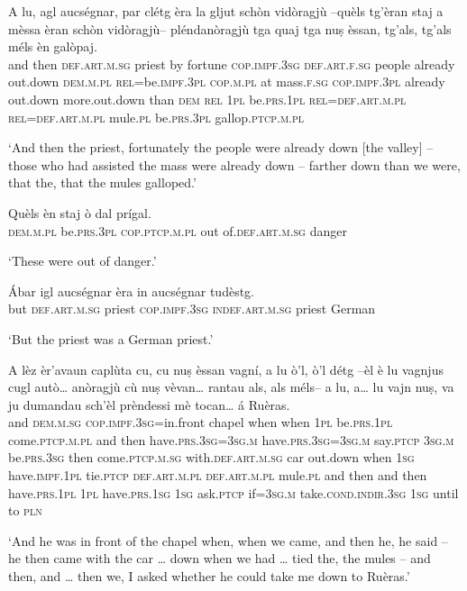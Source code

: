 \begin{linenumbers}
\gll   A lu, agl aucségnar, par clétg èra la gljut schòn vidòragjù –quèls tg’èran staj a mèssa èran schòn vidòragjù– pléndanòragjù tga quaj tga nuṣ èssan, tg’als, tg’als méls èn galòpaj.  \\
and then \textsc{def.art.m.sg} priest by fortune \textsc{cop.impf.3sg} \textsc{def.art.f.sg} people already out.down \textsc{dem.m.pl}   \textsc{rel=}be.\textsc{impf.3pl} \textsc{cop.m.pl} at mass.\textsc{f.sg}  \textsc{cop.impf.3pl} already out.down more.out.down than \textsc{dem} \textsc{rel} \textsc{1pl} be.\textsc{prs.1pl} \textsc{rel=def.art.m.pl} \textsc{rel=def.art.m.pl} mule.\textsc{pl} be.\textsc{prs.3pl}  gallop.\textsc{ptcp.m.pl} \\
\end{linenumbers}
\medskip
\glt `And then the priest, fortunately the people were already down [the valley] – those who had assisted the mass were already down – farther down than we were, that the, that the mules galloped.'
\medskip

\begin{linenumbers}
\gll   Quèls èn staj ò dal prígal. \\
 \textsc{dem.m.pl} be.\textsc{prs.3pl} \textsc{cop.ptcp.m.pl} out of.\textsc{def.art.m.sg} danger  \\
\end{linenumbers}
\medskip
\glt `These were out of danger.'
\medskip

\begin{linenumbers}
\gll   Ábar igl aucségnar èra in aucségnar tudèstg. \\
but \textsc{def.art.m.sg} priest \textsc{cop.impf.3sg} \textsc{indef.art.m.sg} priest German \\
\end{linenumbers}
\medskip
\glt `But the priest was a German priest.'
\medskip

\begin{linenumbers}
\gll   A lèz èr’avaun caplùta cu, cu nuṣ èssan vagní, a lu ò’l, ò’l détg –èl è lu vagnjus cugl autò… anòragjù cù nuṣ vèvan… rantau als, als méls– a lu, a… lu vajn nuṣ, va ju dumandau sch’èl prèndessi mè tocan… á Ruèras. \\
and \textsc{dem.m.sg} \textsc{cop.impf.3sg=}in.front  chapel when when \textsc{1pl} be.\textsc{prs.1pl}  come.\textsc{ptcp.m.pl} and then have.\textsc{prs.3sg=3sg.m} have.\textsc{prs.3sg=3sg.m} say.\textsc{ptcp} \textsc{3sg.m}  be.\textsc{prs.3sg} then come.\textsc{ptcp.m.sg} with.\textsc{def.art.m.sg} car out.down when \textsc{1sg} have.\textsc{impf.1pl} tie.\textsc{ptcp} \textsc{def.art.m.pl}  \textsc{def.art.m.pl} mule.\textsc{pl} and then and then have.\textsc{prs.1pl} \textsc{1pl} have.\textsc{prs.1sg}  \textsc{1sg} ask.\textsc{ptcp} if=\textsc{3sg.m} take.\textsc{cond.indir.3sg} \textsc{1sg} until to \textsc{pln}\\
\end{linenumbers}
\medskip
\glt `And he was in front of the chapel when, when we came, and then he, he said – he then came with the car … down when we had … tied the, the mules – and then, and … then we, I asked whether he could take me down to Ruèras.'
\medskip

